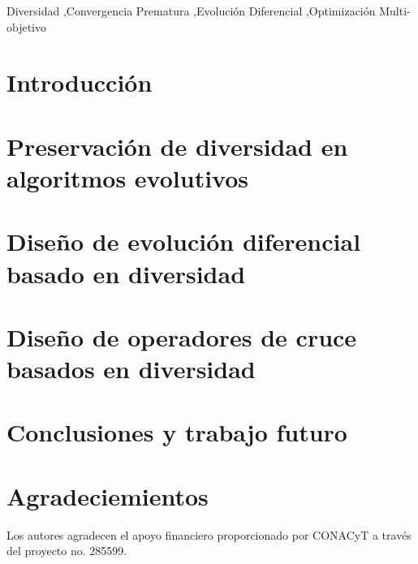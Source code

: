 \documentclass[3p]{elsarticle}
\begin{document}
\begin{frontmatter}
\begin{keyword}
Diversidad \sep Convergencia Prematura \sep Evolución Diferencial \sep Optimización Multi-objetivo 
\end{keyword}

\end{frontmatter}


\section{Introducción}
\label{sec:Introduction}


\section{Preservación de diversidad en algoritmos evolutivos}
\label{sec:Mecanismos}


\section{Diseño de evolución diferencial basado en diversidad}
\label{sec:ED}


\section{Diseño de operadores de cruce basados en diversidad}
\label{sec:Operadores}


\section{Conclusiones y trabajo futuro}
\label{sec:Conclusion}


\section*{Agradeciemientos}
Los autores agradecen el apoyo financiero proporcionado por CONACyT a través del proyecto no. 285599.



\end{document}
